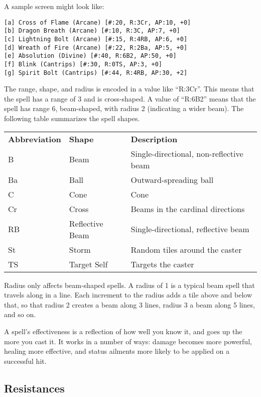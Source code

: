 A sample screen might look like:

\begin{verbatim}
[a] Cross of Flame (Arcane) [#:20, R:3Cr, AP:10, +0]
[b] Dragon Breath (Arcane) [#:10, R:3C, AP:7, +0]
[c] Lightning Bolt (Arcane) [#:15, R:4RB, AP:6, +0]
[d] Wreath of Fire (Arcane) [#:22, R:2Ba, AP:5, +0]
[e] Absolution (Divine) [#:40, R:6B2, AP:50, +0]
[f] Blink (Cantrips) [#:30, R:0TS, AP:3, +0]
[g] Spirit Bolt (Cantrips) [#:44, R:4RB, AP:30, +2]
\end{verbatim}

The range, shape, and radius is encoded in a value like ``R:3Cr''.  This
means that the spell has a range of 3 and is cross-shaped.  A value of
``R:6B2'' means that the spell has range 6, beam-shaped, with radius 2
(indicating a wider beam).  The following table summarizes the spell
shapes.

\begin{table}[h]
\begin{tabular}{lll}
{\bf Abbreviation} & {\bf Shape} & {\bf Description} \\
B & Beam & Single-directional, non-reflective beam \\
Ba & Ball & Outward-spreading ball \\
C & Cone & Cone \\
Cr & Cross & Beams in the cardinal directions \\
RB & Reflective Beam & Single-directional, reflective beam \\
St & Storm & Random tiles around the caster \\
TS & Target Self & Targets the caster \\
\end{tabular}
\end{table}

Radius only affects beam-shaped spells.  A radius of 1 is a typical
beam spell that travels along in a line.  Each increment to the radius
adds a tile above and below that, so that radius 2 creates a beam along
3 lines, radius 3 a beam along 5 lines, and so on.

A spell's effectiveness is a reflection of how well you know it, and goes
up the more you cast it.  It works in a number of ways: damage becomes more
powerful, healing more effective, and status ailments more likely to be
applied on a successful hit.
\subsection{Resistances}

